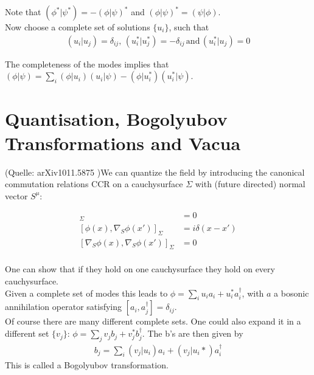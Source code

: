 Note that \((\phi^*|\psi^*) = -(\phi|\psi)^*\) and \((\phi|\psi)^* = (\psi|\phi)\).\\

Now choose a complete set of solutions $\{u_i\}$, such that
\begin{align}
(u_i| u_j) = \delta_{ij},\,(u_i^*| u_j^*) = -\delta_{ij}\,\text{and}\,(u_i^*| u_j) = 0
\end{align}

The completeness of the modes implies that \((\phi|\psi) = \sum_i (\phi|u_i)(u_i|\psi) - (\phi|u_i^*)(u_i^*|\psi)\).



\section{Quantisation, Bogolyubov Transformations and Vacua}

(Quelle: arXiv1011.5875 )We can quantize the field by introducing the canonical commutation relations CCR on a cauchysurface \(\Sigma\) with (future directed) normal vector $S^\mu$:

\begin{align}
[\phi(x),\phi(x')]_\Sigma &= 0\\
[\phi(x),\nabla_S \phi(x')]_\Sigma &= i\delta(x-x')\\
[\nabla_S \phi(x),\nabla_S \phi(x')]_\Sigma &= 0\\
\end{align}

One can show that if they hold on one cauchysurface they hold on every cauchysurface.\\
Given a complete set of modes this leads to \(\phi = \sum_i u_i a_i + u_i^* a_i^\dagger\), with \(a\) a bosonic annihilation operator satisfying \([a_i,a_j^\dagger] = \delta_{ij}\).\\

Of course there are many different complete sets. One could also expand it in a different set \(\{v_j\}\): \(\phi = \sum_j v_j b_j + v_j^* b_j^\dagger\). The b's are then given by 
\begin{align}
b_j = \sum_i (v_j|u_i) a_i + (v_j|u_i*) a_i^\dagger
\label{equ:qft_bogolyubov}
\end{align}
This is called a Bogolyubov transformation.\\

